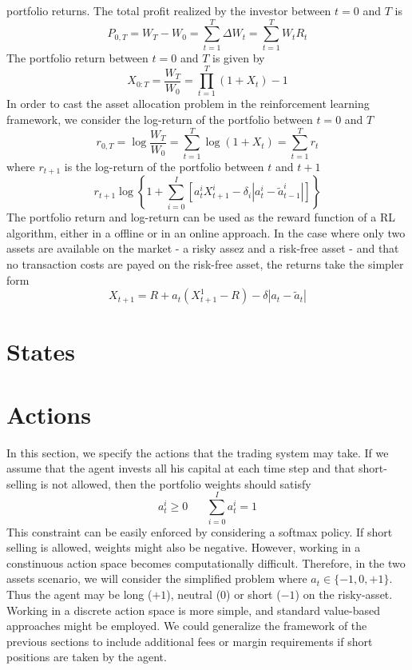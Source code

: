 portfolio returns. The total profit realized by the investor between $t=0$ and
$T$ is 
\begin{equation*}
	P_{0,T} = W_T - W_0 = \sum^{T}_{t=1} \Delta W_t = \sum^{T}_{t=1} W_t R_t  
\end{equation*}
The portfolio return between $t=0$ and $T$ is given by
\begin{equation}
	X_{0:T} = \frac{W_T}{W_0} = \prod_{t=1}^T (1+X_t) - 1
\end{equation}
In order to cast the asset allocation problem in the reinforcement learning
framework, we consider the log-return of the portfolio between $t=0$ and $T$
\begin{equation}
	r_{0,T} = \log \frac{W_T}{W_0} = \sum^{T}_{t=1} \log(1+X_t) = \sum_{t=1}^T
	r_t
\end{equation}
where $r_{t+1}$ is the log-return of the portfolio between $t$ and $t+1$
\begin{equation}
	r_{t+1} \log \left\{ 1 + \sum^{I}_{i=0} \left[ a_t^i X_{t+1}^i - \delta_i
	\left| a_t^i - \tilde{a}_{t-1}^i \right| \right] \right\}
\end{equation}
The portfolio return and log-return can be used as the reward function of a
RL algorithm, either in a offline or in an online approach. In the case where
only two assets are available on the market - a risky assez and a risk-free
asset - and that no transaction costs are payed on the risk-free asset, the
returns take the simpler form
\begin{equation}
	X_{t+1} = R + a_t (X_{t+1}^1 - R) - \delta \left| a_t - \tilde{a}_t \right|
\end{equation} 

\section{States}

\section{Actions}
In this section, we specify the actions that the trading system may take. If we
assume that the agent invests all his capital at each time step and that
short-selling is not allowed, then the portfolio weights should satisfy
\begin{equation} 
	a_t^i \geq 0 \;\;\;\;\;\; \sum^{I}_{i=0} a_t^i = 1
\end{equation} 
This constraint can be easily enforced by considering a softmax policy. If
short selling is allowed, weights might also be negative. However, working in a
constinuous action space becomes computationally difficult.  Therefore, in the
two assets scenario, we will consider the simplified problem where $a_t \in
\{-1, 0, +1\}$. Thus the agent may be long ($+1$), neutral ($0$) or short
($-1$) on the risky-asset. Working in a discrete action space is more simple,
and standard value-based approaches might be employed. We could generalize the
framework of the previous sections to include additional fees or margin
requirements if short positions are taken by the agent.

